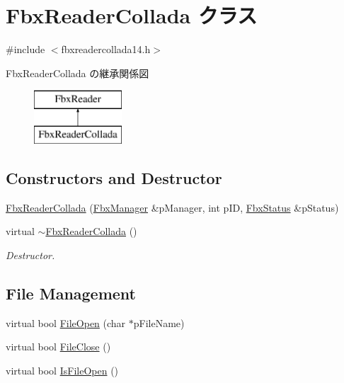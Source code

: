 \hypertarget{class_fbx_reader_collada}{}\section{Fbx\+Reader\+Collada クラス}
\label{class_fbx_reader_collada}


{\ttfamily \#include $<$fbxreadercollada14.\+h$>$}

Fbx\+Reader\+Collada の継承関係図\begin{figure}[H]
\begin{center}
\leavevmode
\includegraphics[height=2.000000cm]{class_fbx_reader_collada}
\end{center}
\end{figure}
\subsection*{Constructors and Destructor}
\begin{DoxyCompactItemize}
\item 
\hyperlink{class_fbx_reader_collada_aec4f19904290f36b47c9de5f193f626a}{Fbx\+Reader\+Collada} (\hyperlink{class_fbx_manager}{Fbx\+Manager} \&p\+Manager, int p\+ID, \hyperlink{class_fbx_status}{Fbx\+Status} \&p\+Status)
\item 
virtual \hyperlink{class_fbx_reader_collada_a0a09a8a6955bc948a743edd1e10f99a1}{$\sim$\+Fbx\+Reader\+Collada} ()
\begin{DoxyCompactList}\small\item\em Destructor. \end{DoxyCompactList}\end{DoxyCompactItemize}
\subsection*{File Management}
\begin{DoxyCompactItemize}
\item 
virtual bool \hyperlink{class_fbx_reader_collada_aec7a5267f85187eeb26dd55ec250119e}{File\+Open} (char $\ast$p\+File\+Name)
\item 
virtual bool \hyperlink{class_fbx_reader_collada_a5668036ed12534fd339f3106c0d09864}{File\+Close} ()
\item 
virtual bool \hyperlink{class_fbx_reader_collada_a6732d6488100827a26065750e80f3a27}{Is\+File\+Open} ()
\end{DoxyCompactItemize}
